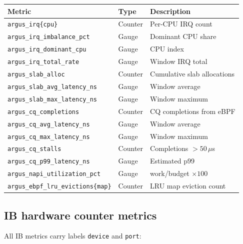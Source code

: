 \documentclass[11pt]{article}
\begin{document}
\begin{center}
\small
\begin{tabular}{lll}
\toprule
Metric & Type & Description \\
\midrule
\texttt{argus\_irq\{cpu\}}                  & Counter & Per-CPU IRQ count \\
\texttt{argus\_irq\_imbalance\_pct}          & Gauge   & Dominant CPU share \\
\texttt{argus\_irq\_dominant\_cpu}           & Gauge   & CPU index \\
\texttt{argus\_irq\_total\_rate}             & Gauge   & Window IRQ total \\
\texttt{argus\_slab\_alloc}                  & Counter & Cumulative slab allocations \\
\texttt{argus\_slab\_avg\_latency\_ns}       & Gauge   & Window average \\
\texttt{argus\_slab\_max\_latency\_ns}       & Gauge   & Window maximum \\
\texttt{argus\_cq\_completions}              & Counter & CQ completions from eBPF \\
\texttt{argus\_cq\_avg\_latency\_ns}         & Gauge   & Window average \\
\texttt{argus\_cq\_max\_latency\_ns}         & Gauge   & Window maximum \\
\texttt{argus\_cq\_stalls}                   & Counter & Completions $>50\,\mu$s \\
\texttt{argus\_cq\_p99\_latency\_ns}         & Gauge   & Estimated p99 \\
\texttt{argus\_napi\_utilization\_pct}       & Gauge   & work/budget $\times 100$ \\
\texttt{argus\_ebpf\_lru\_evictions\{map\}}  & Counter & LRU map eviction count \\
\bottomrule
\end{tabular}
\end{center}

\subsection{IB hardware counter metrics}

All IB metrics carry labels \texttt{device} and \texttt{port}:
\end{document}
